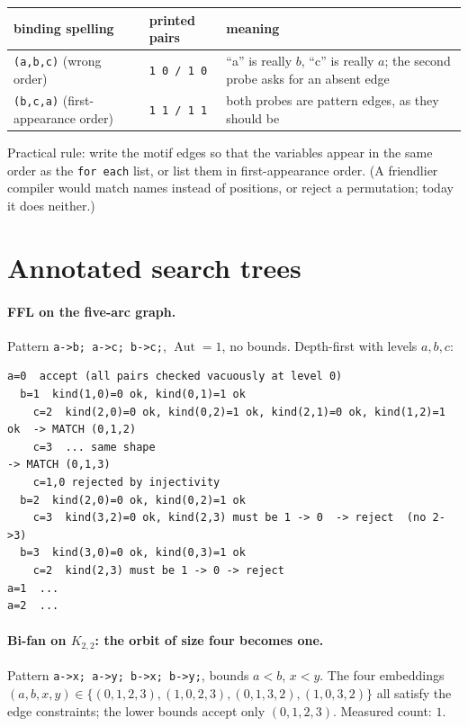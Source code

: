 \documentclass[11pt,a4paper]{article}
\newcommand{\code}[1]{\texttt{#1}}
\newcommand{\Aut}{\operatorname{Aut}}
\begin{document}
\begin{center}
\begin{tabular}{@{}lll@{}}
\toprule
binding spelling & printed pairs & meaning \\
\midrule
\code{(a,b,c)} (wrong order) & \code{1 0 / 1 0} & ``a'' is really $b$, ``c'' is really $a$; the second probe asks for an absent edge \\
\code{(b,c,a)} (first-appearance order) & \code{1 1 / 1 1} & both probes are pattern edges, as they should be \\
\bottomrule
\end{tabular}
\end{center}

\noindent Practical rule: write the motif edges so that the variables appear in
the same order as the \code{for each} list, or list them in first-appearance
order. (A friendlier compiler would match names instead of positions, or reject
a permutation; today it does neither.)

\appendix

\section{Annotated search trees}

\paragraph{FFL on the five-arc graph.} Pattern \code{a->b; a->c; b->c;},
$\Aut=1$, no bounds. Depth-first with levels $a,b,c$:

\begin{lstlisting}[style=plain]
a=0  accept (all pairs checked vacuously at level 0)
  b=1  kind(1,0)=0 ok, kind(0,1)=1 ok
    c=2  kind(2,0)=0 ok, kind(0,2)=1 ok, kind(2,1)=0 ok, kind(1,2)=1 ok  -> MATCH (0,1,2)
    c=3  ... same shape                                                -> MATCH (0,1,3)
    c=1,0 rejected by injectivity
  b=2  kind(2,0)=0 ok, kind(0,2)=1 ok
    c=3  kind(3,2)=0 ok, kind(2,3) must be 1 -> 0  -> reject  (no 2->3)
  b=3  kind(3,0)=0 ok, kind(0,3)=1 ok
    c=2  kind(2,3) must be 1 -> 0 -> reject
a=1  ...
a=2  ...
\end{lstlisting}

\paragraph{Bi-fan on $K_{2,2}$: the orbit of size four becomes one.} Pattern
\code{a->x; a->y; b->x; b->y;}, bounds $a<b$, $x<y$. The four embeddings
$(a,b,x,y)\in\{(0,1,2,3),(1,0,2,3),(0,1,3,2),(1,0,3,2)\}$ all satisfy the edge
constraints; the lower bounds accept only $(0,1,2,3)$. Measured count: $1$.
\end{document}
